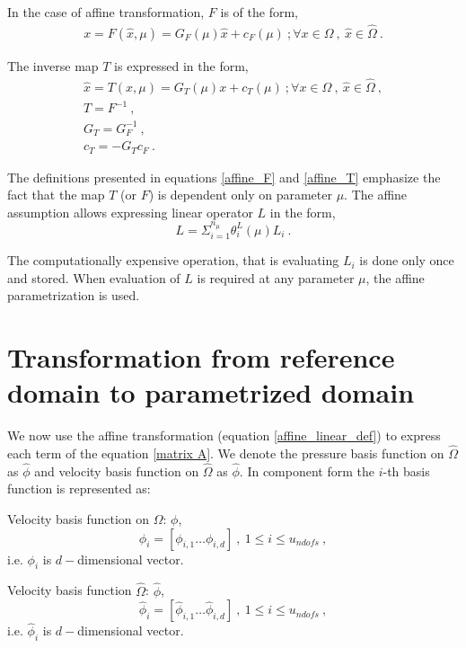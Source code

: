 \documentclass[a4paper,oneside,openright,spanish,english]{book}
\begin{document}
In the case of affine transformation, $F$ is of the form,
\begin{gather}\label{affine_F}
x = F(\hat{x},\mu) = G_F(\mu)\hat{x} + c_F(\mu) \ ; \forall x \in \Omega \ , \ \hat{x} \in \hat{\Omega} \ .
\end{gather}

The inverse map $T$ is expressed in the form,
\begin{gather}\label{affine_T}
\hat{x} = T(x,\mu) = G_T(\mu)x + c_T(\mu) \ ; \forall x \in \Omega \ , \ \hat{x} \in \hat{\Omega} \ , \\
T = F^{-1} \ ,\\
G_T = G_F^{-1} \ , \\
c_T = -G_T c_F \ .
\end{gather}

The definitions presented in equations \eqref{affine_F} and \eqref{affine_T} emphasize the fact that the map $T$ (or $F$) is dependent only on parameter $\mu$. The affine assumption allows expressing linear operator $L$ in the form,
\begin{equation}\label{affine_linear_def}
L = \Sigma_{i=1}^{n_\mu} \theta_i^L (\mu) L_i \ .
\end{equation}

The computationally expensive operation, that is evaluating $L_i$ is done only once and stored. When evaluation of $L$ is required at any parameter $\mu$, the affine parametrization is used.

\section{Transformation from reference domain to parametrized domain}

We now use the affine transformation (equation \eqref{affine_linear_def}) to express each term of the equation \eqref{matrix A}. We denote the pressure basis function on $\hat{\Omega}$ as $\hat{\phi}$ and velocity basis function on $\hat{\Omega}$ as $\hat{\phi}$. In component form the $i$-th basis function is represented as:

Velocity basis function on $\Omega$: $\phi$,
\begin{equation}
\phi_i = [\phi_{i,1} \ldots \phi_{i,d}] \ , \ 1 \leq i \leq u_{ndofs} \ ,
\end{equation}
i.e. $\phi_i$ is $d-$dimensional vector.

Velocity basis function $\hat{\Omega}$: $\hat{\phi}$,
\begin{equation}
\hat{\phi}_i = [\hat{\phi}_{i,1} \ldots \hat{\phi}_{i,d}] \ , \ 1 \leq i \leq u_{ndofs} \ ,
\end{equation}
i.e. $\hat{\phi}_i$ is $d-$dimensional vector.
\end{document}
